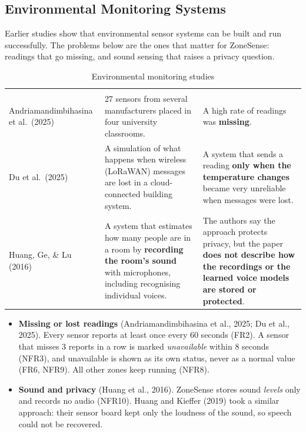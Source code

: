 \documentclass[11pt,a4paper]{article}
\begin{document}
\subsection{Environmental Monitoring Systems}
Earlier studies show that environmental sensor systems can be built and run successfully. The problems below are the ones that matter for ZoneSense: readings that go missing, and sound sensing that raises a privacy question.

{\small\stripe
\begin{xltabular}{\linewidth}{|L{3.2cm}|L{5.4cm}|Y|}
\caption{Environmental monitoring studies}\label{tab:env}\\
\hline\headrow
{} &  & \\\hline
\endfirsthead
\hline\headrow
{} &  & \\\hline
\endhead
Andriamandimbihasina et al.\ (2025) & 27 sensors from several manufacturers placed in four university classrooms. & A high rate of readings was \textbf{missing}.\\\hline
Du et al.\ (2025) & A simulation of what happens when wireless (LoRaWAN) messages are lost in a cloud-connected building system. & A system that sends a reading \textbf{only when the temperature changes} became very unreliable when messages were lost.\\\hline
Huang, Ge, \& Lu (2016) & A system that estimates how many people are in a room by \textbf{recording the room's sound} with microphones, including recognising individual voices. & The authors say the approach protects privacy, but the paper \textbf{does not describe how the recordings or the learned voice models are stored or protected}.\\\hline
\end{xltabular}}

\begin{itemize}
\item \textbf{Missing or lost readings} (Andriamandimbihasina et al., 2025; Du et al., 2025). Every sensor reports at least once every 60 seconds (FR2). A sensor that misses 3 reports in a row is marked \textit{unavailable} within 8 seconds (NFR3), and unavailable is shown as its own status, never as a normal value (FR6, NFR9). All other zones keep running (NFR8).
\item \textbf{Sound and privacy} (Huang et al., 2016). ZoneSense stores sound \textit{levels} only and records no audio (NFR10). Huang and Kieffer (2019) took a similar approach: their sensor board kept only the loudness of the sound, so speech could not be recovered.
\end{itemize}
\end{document}
